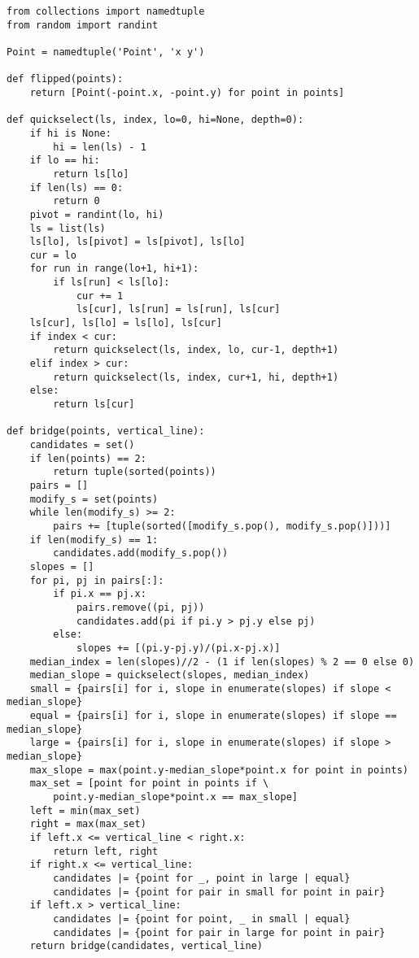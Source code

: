 \begin{verbatim}
from collections import namedtuple
from random import randint

Point = namedtuple('Point', 'x y')

def flipped(points):
    return [Point(-point.x, -point.y) for point in points]

def quickselect(ls, index, lo=0, hi=None, depth=0):
    if hi is None:
        hi = len(ls) - 1
    if lo == hi:
        return ls[lo]
    if len(ls) == 0:
        return 0
    pivot = randint(lo, hi)
    ls = list(ls)
    ls[lo], ls[pivot] = ls[pivot], ls[lo]
    cur = lo
    for run in range(lo+1, hi+1):
        if ls[run] < ls[lo]:
            cur += 1
            ls[cur], ls[run] = ls[run], ls[cur]
    ls[cur], ls[lo] = ls[lo], ls[cur]
    if index < cur:
        return quickselect(ls, index, lo, cur-1, depth+1)
    elif index > cur:
        return quickselect(ls, index, cur+1, hi, depth+1)
    else:
        return ls[cur]

def bridge(points, vertical_line):
    candidates = set()
    if len(points) == 2:
        return tuple(sorted(points))
    pairs = []
    modify_s = set(points)
    while len(modify_s) >= 2:
        pairs += [tuple(sorted([modify_s.pop(), modify_s.pop()]))]
    if len(modify_s) == 1:
        candidates.add(modify_s.pop())
    slopes = []
    for pi, pj in pairs[:]:
        if pi.x == pj.x:
            pairs.remove((pi, pj))
            candidates.add(pi if pi.y > pj.y else pj)
        else:
            slopes += [(pi.y-pj.y)/(pi.x-pj.x)]
    median_index = len(slopes)//2 - (1 if len(slopes) % 2 == 0 else 0)
    median_slope = quickselect(slopes, median_index)
    small = {pairs[i] for i, slope in enumerate(slopes) if slope < median_slope}
    equal = {pairs[i] for i, slope in enumerate(slopes) if slope == median_slope}
    large = {pairs[i] for i, slope in enumerate(slopes) if slope > median_slope}
    max_slope = max(point.y-median_slope*point.x for point in points)
    max_set = [point for point in points if \
    	point.y-median_slope*point.x == max_slope]
    left = min(max_set)
    right = max(max_set)
    if left.x <= vertical_line < right.x:
        return left, right
    if right.x <= vertical_line:
        candidates |= {point for _, point in large | equal}
        candidates |= {point for pair in small for point in pair}
    if left.x > vertical_line:
        candidates |= {point for point, _ in small | equal}
        candidates |= {point for pair in large for point in pair}
    return bridge(candidates, vertical_line)


\end{verbatim}
